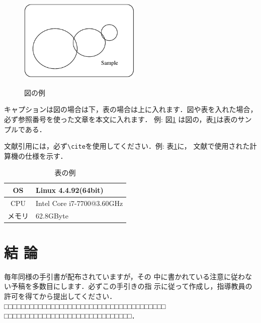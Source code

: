 \documentclass[10pt,twocolumn, a4j]{jsarticle}
\begin{document}
\begin{figure}[htbp]
  \begin{center}
     \includegraphics[width=5.8cm,keepaspectratio]{figure.pdf}\\
  \end{center}
  \caption{図の例}%
\label{fig1}
\end{figure}

キャプションは図の場合は下，表の場合は上に入れます．図や表を入れた場合，
必ず参照番号を使った文章を本文に入れます．
例: 図\ref{fig1} は図の，表\ref{table1}は表のサンプルである．

文献引用には，必ず\verb+\cite+を使用してください．例: 表\ref{table1}に，
文献\cite{labelName}で使用された計算機の仕様を示す．


\begin{table}[!htb]
 \begin{center}
   \caption{表の例}
  \begin{tabular}{|c|l|} \hline
  OS &  Linux 4.4.92(64bit) \\ \hline
  CPU & Intel Core i7-7700@3.60GHz\\ \hline
 メモリ & 62.8GByte\\ \hline
  \end{tabular}
 \label{table1}
 \end{center}
\end{table}

\section{結 論}
毎年同様の手引書が配布されていますが，その
中に書かれている注意に従わない予稿を多数目にします．必ずこの手引きの指
示に従って作成し，指導教員の許可を得てから提出してください．
□□□□□□□□□□□□□□□□□□□□□□□□□□□□□□□□□□□□□□
□□□□□□□□□□□□□□□□□□□□□□□□□□□□□□．


\nocite{kinosita}
\nocite{suetake}
\nocite{labelName}
\end{document}
